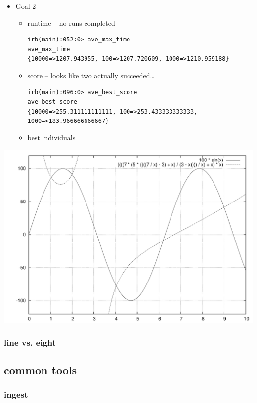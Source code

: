 \documentclass[11pt]{article}
\begin{document}
\begin{itemize}
\item Goal 2

\begin{itemize}
\item runtime -- no runs completed
\begin{lstlisting}
irb(main):052:0> ave_max_time
ave_max_time
{10000=>1207.943955, 100=>1207.720609, 1000=>1210.959188}
\end{lstlisting}
\item score -- looks like two actually succeeded\ldots{}
\begin{lstlisting}
irb(main):096:0> ave_best_score
ave_best_score
{10000=>255.311111111111, 100=>253.433333333333, 1000=>183.966666666667}
\end{lstlisting}
\item best individuals
\end{itemize}

\end{itemize}


\includegraphics[width=\textwidth]{graphs/s_100_g_2_best.pdf}
    
\subsubsection*{line vs. eight}
\label{sec-2.4.2}
\subsection*{common tools}
\label{sec-2.5}
\subsubsection*{ingest}
\label{sec-2.5.1}
\end{document}
